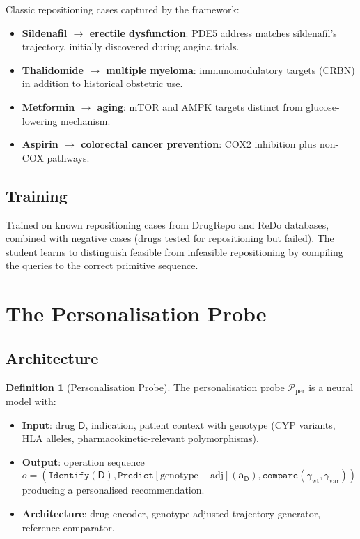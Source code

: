 \documentclass[11pt,twocolumn,a4paper]{article}
\theoremstyle{definition}
\newtheorem{definition}[theorem]{Definition}
\theoremstyle{remark}
\newcommand{\probe}{\mathcal{P}}
\newcommand{\drugaddr}{\mathbf{a}_{\mathsf{D}}}
\begin{document}
Classic repositioning cases captured by the framework:
\begin{itemize}[nosep,leftmargin=*]
\item \textbf{Sildenafil $\to$ erectile dysfunction}: PDE5 address matches sildenafil's trajectory, initially discovered during angina trials.
\item \textbf{Thalidomide $\to$ multiple myeloma}: immunomodulatory targets (CRBN) in addition to historical obstetric use.
\item \textbf{Metformin $\to$ aging}: mTOR and AMPK targets distinct from glucose-lowering mechanism.
\item \textbf{Aspirin $\to$ colorectal cancer prevention}: COX2 inhibition plus non-COX pathways.
\end{itemize}

\subsection{Training}

Trained on known repositioning cases from DrugRepo and ReDo databases, combined with negative cases (drugs tested for repositioning but failed). The student learns to distinguish feasible from infeasible repositioning by compiling the queries to the correct primitive sequence.

\section{The Personalisation Probe}
\label{sec:personalisation_probe}

\subsection{Architecture}

\begin{definition}[Personalisation Probe]
\label{def:personalisation_probe}
The personalisation probe $\probe_{\mathrm{per}}$ is a neural model with:
\begin{itemize}[nosep,leftmargin=*]
\item \textbf{Input}: drug $\mathsf{D}$, indication, patient context with genotype (CYP variants, HLA alleles, pharmacokinetic-relevant polymorphisms).
\item \textbf{Output}: operation sequence
\begin{equation*}
o = (\texttt{Identify}(\mathsf{D}), \texttt{Predict}[\mathrm{genotype-adj}](\drugaddr), \texttt{compare}(\gamma_{\mathrm{wt}}, \gamma_{\mathrm{var}}))
\end{equation*}
producing a personalised recommendation.
\item \textbf{Architecture}: drug encoder, genotype-adjusted trajectory generator, reference comparator.
\end{itemize}
\end{definition}
\end{document}
